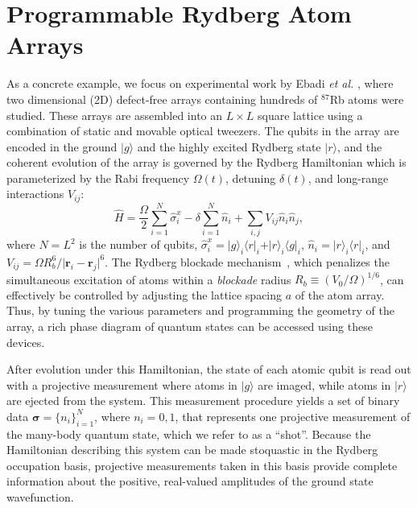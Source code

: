 \documentclass[twocolumn,
                showpacs,
                nofootinbib,
                nobibnotes,
                aps,
                superscriptaddress,
                amssymb,
                amsmath,
                floatfix,
                reprint,
                prx, 
                notitlepage,
                showkeys,
                10pt,
		]{revtex4-2}
\begin{document}
\section{Programmable Rydberg Atom Arrays}
%
As a concrete example, we focus on experimental work by Ebadi {\it et al.} \cite{ebadi2021quantum}, where two dimensional (2D) defect-free arrays containing hundreds of $^{87}$Rb atoms were studied. These arrays are assembled into an $L\times L$ square lattice using a combination of static and movable optical tweezers. The qubits in the array are encoded in the ground $\vert g \rangle$ and the highly excited Rydberg state $\vert r\rangle$, and the coherent evolution of the array is governed by the Rydberg Hamiltonian which is parameterized by the Rabi frequency $\Omega(t)$, detuning $\delta(t)$, and long-range interactions $V_{ij}$:
\begin{equation}
    \hat{H} = \frac{\Omega}{2}\sum_{i=1}^{N}\hat{\sigma}^{x}_{i} - \delta \sum_{i=1}^{N}\hat{n}_i + \sum_{i,j}V_{ij}\hat{n}_i\hat{n}_j,
\label{Hamiltonian}
\end{equation}
where $N = L^2$ is the number of qubits, $\hat{\sigma}^{x}_{i} = \vert g \rangle_i \langle r\vert_i + \vert r \rangle_i \langle g\vert_i $, 
$\hat{n}_i = \vert r\rangle_i \langle r \vert_i$, and
$V_{ij} = \Omega R_b^6/\vert \mathbf{r}_i - \mathbf{r}_j\vert^6$.
The Rydberg blockade mechanism~\cite{lukin2001dipole}, which penalizes the simultaneous excitation of atoms within a {\it blockade} radius $R_b \equiv (V_0/\Omega)^{1/6}$, can effectively be controlled by adjusting the lattice spacing $a$ of the atom array. 
Thus, by tuning the various parameters and programming the geometry of the array, a rich phase diagram of quantum states can be accessed using these devices.

After evolution under this Hamiltonian, the state of each atomic qubit is read out with a projective measurement where atoms in $| g \rangle$ are imaged, while atoms in $| r \rangle$ are ejected from the system.
This measurement procedure yields a set of binary data $\boldsymbol\sigma = 
\{n_i\}_{i=1}^{N}$, where $n_i = 0,1$, that represents one projective measurement of the many-body quantum state, which we refer to as a ``shot''.  
Because the Hamiltonian describing this system can be made stoquastic in the Rydberg occupation basis, projective measurements taken in this basis provide complete information about the positive, real-valued amplitudes of the ground state wavefunction.
\end{document}
